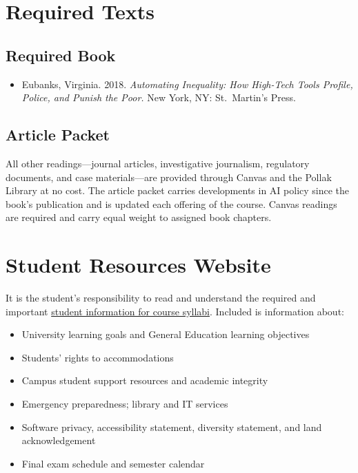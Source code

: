 \documentclass[12pt]{article}
\begin{document}
\section*{Required Texts}

\subsection*{Required Book}

\begin{itemize}
    \item Eubanks, Virginia. 2018. \emph{Automating Inequality: How High-Tech Tools Profile, Police, and Punish the Poor.} New York, NY: St.\ Martin's Press.
\end{itemize}

\subsection*{Article Packet}

All other readings---journal articles, investigative journalism, regulatory documents, and case materials---are provided through Canvas and the Pollak Library at no cost. The article packet carries developments in AI policy since the book's publication and is updated each offering of the course. Canvas readings are required and carry equal weight to assigned book chapters.

\section*{Student Resources Website}
It is the student's responsibility to read and understand the required and important \href{https://fdc.fullerton.edu/teaching/student-info-syllabi.html}{student information for course syllabi}. Included is information about:

\begin{itemize}
\item University learning goals and General Education learning objectives
\item Students' rights to accommodations
\item Campus student support resources and academic integrity
\item Emergency preparedness; library and IT services
\item Software privacy, accessibility statement, diversity statement, and land acknowledgement
\item Final exam schedule and semester calendar
\end{itemize}
\end{document}
